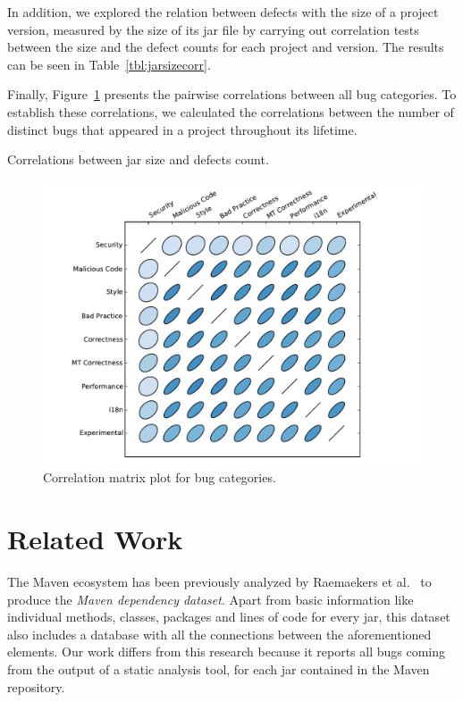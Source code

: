 \documentclass{sig-alternate}
\begin{document}
In addition, we explored the relation between defects with the size of a project
version, measured by the size of its {\sc jar} file by carrying out
correlation tests between the size and the defect counts for each
project and version. The results can be seen in
Table~\ref{tbl:jarsizecorr}.

Finally, Figure~\ref{fig:corrplot} presents the pairwise correlations
between all bug categories. To establish these correlations,
we calculated the
correlations between the number of distinct bugs that appeared in
a project throughout its lifetime.

\begin{table}[hbt]
    \centering
    
    \caption{Correlations between {\sc jar} size and defects count.}
    \label{tbl:jarsizecorr}
\end{table}


\begin{figure}
  \centering
  \includegraphics[scale=0.43]{corrplot.pdf}
  \caption{Correlation matrix plot for bug categories.}
  \label{fig:corrplot}
\end{figure}

\section{Related Work}
\label{sec:rel}

The Maven ecosystem has been previously analyzed by
Raemaekers et al.~\cite{RDV13}
to produce the {\it Maven dependency dataset}.
Apart from basic information like individual methods, classes,
packages and lines of code for every {\sc jar}, this dataset
also includes a database with all the
connections between the aforementioned elements.
Our work differs from this research because it
reports all bugs coming from the output of a
static analysis tool, for each {\sc jar}
contained in the Maven repository.
\end{document}
